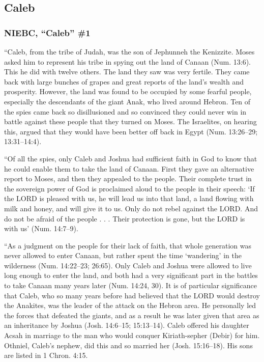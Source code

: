 
	\subsection{Caleb} %
		\label{CALEB}
		
		\subsubsection{NIEBC, ``Caleb'' \#1}
		
			``Caleb, from the tribe of Judah, was the son of Jephunneh the Kenizzite. Moses asked him to represent his tribe in spying out the land of Canaan (Num. 13:6). This he did with twelve others. The land they saw was very fertile. They came back with large bunches of grapes and great reports of the land's wealth and prosperity. However, the land was found to be occupied by some fearful people, especially the descendants of the giant Anak, who lived around Hebron. Ten of the spies came back so disillusioned and so convinced they could never win in battle against these people that they turned on Moses. The Israelites, on hearing this, argued that they would have been better off back in Egypt (Num. 13:26--29; 13:31--14:4).
			
			``Of all the spies, only Caleb and Joshua had sufficient faith in God to know that he could enable them to take the land of Canaan. First they gave an alternative report to Moses, and then they appealed to the people. Their complete trust in the sovereign power of God is proclaimed aloud to the people in their speech: `If the LORD is pleased with us, he will lead us into that land, a land flowing with milk and honey, and will give it to us. Only do not rebel against the LORD. And do not be afraid of the people . . . Their protection is gone, but the LORD is with us' (Num. 14:7--9).
			
			``As a judgment on the people for their lack of faith, that whole generation was never allowed to enter Canaan, but rather spent the time `wandering' in the wilderness (Num. 14:22--23; 26:65). Only Caleb and Joshua were allowed to live long enough to enter the land, and both had a very significant part in the battles to take Canaan many years later (Num. 14:24, 30). It is of particular significance that Caleb, who so many years before had believed that the LORD would destroy the Anakites, was the leader of the attack on the Hebron area. He personally led the forces that defeated the giants, and as a result he was later given that area as an inheritance by Joshua (Josh. 14:6--15; 15:13--14). Caleb offered his daughter Acsah in marriage to the man who would conquer Kiriath-sepher (Debir) for him. Othniel, Caleb's nephew, did this and so married her (Josh. 15:16--18). His sons are listed in 1 Chron. 4:15.
			

